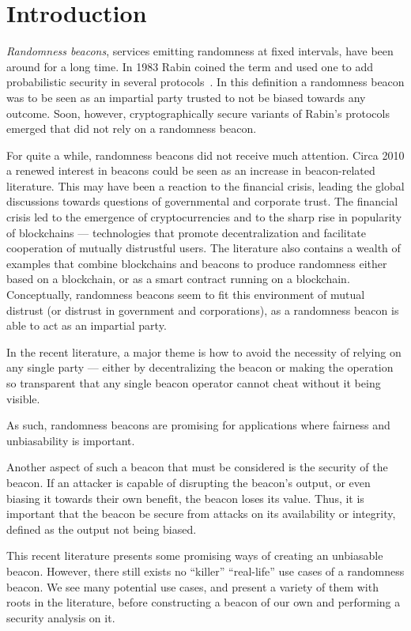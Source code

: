 \section{Introduction}

\emph{Randomness beacons}, services emitting randomness at fixed intervals, have been around for a long time.
In 1983 Rabin coined the term and used one to add probabilistic security in several protocols~\cite{rabin1983transaction}.
In this definition a randomness beacon was to be seen as an impartial party trusted to not be biased towards any outcome.
Soon, however, cryptographically secure variants of Rabin's protocols emerged \cite{BGMR} that did not rely on a randomness beacon.

For quite a while, randomness beacons did not receive much attention.
Circa 2010 a renewed interest in beacons could be seen as an increase in beacon-related literature.
This may have been a reaction to the financial crisis, leading the global discussions towards questions of governmental and corporate trust.
The financial crisis led to the emergence of cryptocurrencies and to the sharp rise in popularity of blockchains --- technologies that promote decentralization and facilitate cooperation of mutually distrustful users.
The literature also contains a wealth of examples that combine blockchains and beacons to produce randomness either based on a blockchain, or as a smart contract running on a blockchain.
Conceptually, randomness beacons seem to fit this environment of mutual distrust (or distrust in government and corporations), as a randomness beacon is able to act as an impartial party.

In the recent literature, a major theme is how to avoid the necessity of relying on any single party --- either by decentralizing the beacon or making the operation so transparent that any single beacon operator cannot cheat without it being visible.

As such, randomness beacons are promising for applications where fairness and unbiasability is important.

Another aspect of such a beacon that must be considered is the security of the beacon.
If an attacker is capable of disrupting the beacon's output, or even biasing it towards their own benefit, the beacon loses its value.
Thus, it is important that the beacon be secure from attacks on its availability or integrity, defined as the output not being biased.

This recent literature presents some promising ways of creating an unbiasable beacon.  However, there still exists no \enquote{killer} \enquote{real-life} use cases of a randomness beacon.
We see many potential use cases, and present a variety of them with roots in the literature, before constructing a beacon of our own and performing a security analysis on it.

